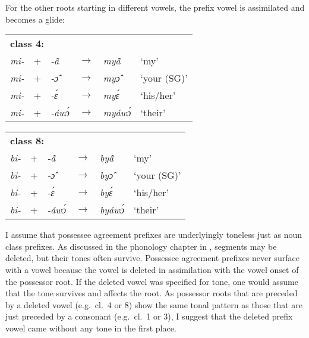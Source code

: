 \noindent For the other roots starting in different vowels, the prefix vowel is assimilated and becomes a glide:

\begin{exe} \ex\label{POSS42}
\begin{tabular}{llllll}
\multicolumn{6}{l}{\bfseries class 4:} \\
 {\itshape mi-} & + & {\itshape -ã̂} & $\rightarrow$ &  {\itshape myã̂} & `my' \\
 {\itshape mi-} & + & {\itshape -ɔ̂} & $\rightarrow$ & {\itshape myɔ̂} & `your (SG)' \\
 {\itshape mi-} & + & {\itshape -ɛ́} & $\rightarrow$ &  {\itshape myɛ́} & `his/her' \\
 {\itshape mi-} & + & {\itshape -áwɔ́} & $\rightarrow$ & {\itshape myáwɔ́} & `their' \\
\end{tabular}
\end{exe}

\begin{exe} \ex\label{POSS82}
\begin{tabular}{llllll}
\multicolumn{6}{l}{\bfseries class 8:}  \\
 {\itshape bi-} & + & {\itshape -ã̂} & $\rightarrow$ &  {\itshape byã̂} & `my' \\
 {\itshape bi-} & + & {\itshape -ɔ̂} & $\rightarrow$ & {\itshape byɔ̂} & `your (SG)' \\
 {\itshape bi-} & + & {\itshape -ɛ́} & $\rightarrow$ &  {\itshape byɛ́} & `his/her' \\
 {\itshape bi-} & + & {\itshape -áwɔ́} & $\rightarrow$ & {\itshape byáwɔ́} & `their' \\
\end{tabular}
\end{exe}

\noindent I assume that possessee agreement prefixes are underlyingly toneless just as noun class prefixes. As discussed in the phonology chapter in , segments may be deleted, but their tones often survive. Possessee agreement prefixes never surface with a vowel because the vowel is deleted in assimilation with the vowel onset of the possessor root. If the deleted vowel was specified for tone, one would assume that the tone survives and affects the root. As possessor roots that are preceded by a deleted vowel (e.g.~cl.~4 or 8) show the same tonal pattern as those that are just preceded by a consonant  (e.g.~cl.~1 or 3), I suggest that the deleted prefix vowel came without any tone in the first place.

